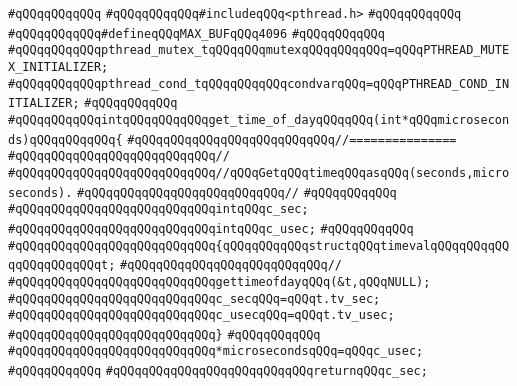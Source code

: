 \verb|#qQQqqQQqqQQq|\newline
\verb|#qQQqqQQqqQQq#includeqQQq<pthread.h>|\newline
\verb|#qQQqqQQqqQQq|\newline
\verb|#qQQqqQQqqQQq#defineqQQqMAX_BUFqQQq4096|\newline
\verb|#qQQqqQQqqQQq|\newline
\verb|#qQQqqQQqqQQqpthread_mutex_tqQQqqQQqmutexqQQqqQQqqQQq=qQQqPTHREAD_MUTEX_INITIALIZER;|\newline
\verb|#qQQqqQQqqQQqpthread_cond_tqQQqqQQqqQQqcondvarqQQq=qQQqPTHREAD_COND_INITIALIZER;|\newline
\verb|#qQQqqQQqqQQq|\newline
\verb|#qQQqqQQqqQQqintqQQqqQQqqQQqget_time_of_dayqQQqqQQq(int*qQQqmicroseconds)qQQqqQQqqQQq{|\newline
\verb|#qQQqqQQqqQQqqQQqqQQqqQQqqQQq//===============|\newline
\verb|#qQQqqQQqqQQqqQQqqQQqqQQqqQQq//|\newline
\verb|#qQQqqQQqqQQqqQQqqQQqqQQqqQQq//qQQqGetqQQqtimeqQQqasqQQq(seconds,microseconds).|\newline
\verb|#qQQqqQQqqQQqqQQqqQQqqQQqqQQq//|\newline
\verb|#qQQqqQQqqQQq|\newline
\verb|#qQQqqQQqqQQqqQQqqQQqqQQqqQQqintqQQqc_sec;|\newline
\verb|#qQQqqQQqqQQqqQQqqQQqqQQqqQQqintqQQqc_usec;|\newline
\verb|#qQQqqQQqqQQq|\newline
\verb|#qQQqqQQqqQQqqQQqqQQqqQQqqQQq{qQQqqQQqqQQqstructqQQqtimevalqQQqqQQqqQQqqQQqqQQqqQQqt;|\newline
\verb|#qQQqqQQqqQQqqQQqqQQqqQQqqQQq//|\newline
\verb|#qQQqqQQqqQQqqQQqqQQqqQQqqQQqgettimeofdayqQQq(&t,qQQqNULL);|\newline
\verb|#qQQqqQQqqQQqqQQqqQQqqQQqqQQqc_secqQQq=qQQqt.tv_sec;|\newline
\verb|#qQQqqQQqqQQqqQQqqQQqqQQqqQQqc_usecqQQq=qQQqt.tv_usec;|\newline
\verb|#qQQqqQQqqQQqqQQqqQQqqQQqqQQq}|\newline
\verb|#qQQqqQQqqQQq|\newline
\verb|#qQQqqQQqqQQqqQQqqQQqqQQqqQQq*microsecondsqQQq=qQQqc_usec;|\newline
\verb|#qQQqqQQqqQQq|\newline
\verb|#qQQqqQQqqQQqqQQqqQQqqQQqqQQqreturnqQQqc_sec;|\newline
